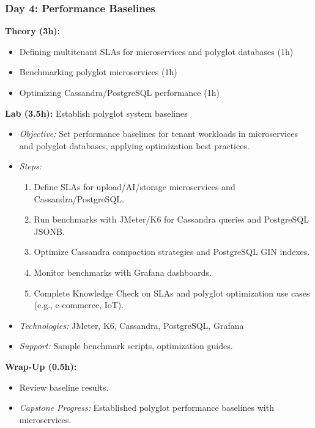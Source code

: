 \documentclass[11pt]{article}
\begin{document}
\subsubsection{Day 4: Performance Baselines}
\textbf{Theory (3h):}
\begin{itemize}
    \item Defining multitenant SLAs for microservices and polyglot databases (1h)
    \item Benchmarking polyglot microservices (1h)
    \item Optimizing Cassandra/PostgreSQL performance (1h)
\end{itemize}
\textbf{Lab (3.5h):} Establish polyglot system baselines
\begin{itemize}
    \item \textit{Objective:} Set performance baselines for tenant workloads in microservices and polyglot databases, applying optimization best practices.
    \item \textit{Steps:}
        \begin{enumerate}
            \item Define SLAs for upload/AI/storage microservices and Cassandra/PostgreSQL.
            \item Run benchmarks with JMeter/K6 for Cassandra queries and PostgreSQL JSONB.
            \item Optimize Cassandra compaction strategies and PostgreSQL GIN indexes.
            \item Monitor benchmarks with Grafana dashboards.
            \item Complete Knowledge Check on SLAs and polyglot optimization use cases (e.g., e-commerce, IoT).
        \end{enumerate}
    \item \textit{Technologies:} JMeter, K6, Cassandra, PostgreSQL, Grafana
    \item \textit{Support:} Sample benchmark scripts, optimization guides.
\end{itemize}
\textbf{Wrap-Up (0.5h):}
\begin{itemize}
    \item Review baseline results.
    \item \textit{Capstone Progress:} Established polyglot performance baselines with microservices.
\end{itemize}
\end{document}
